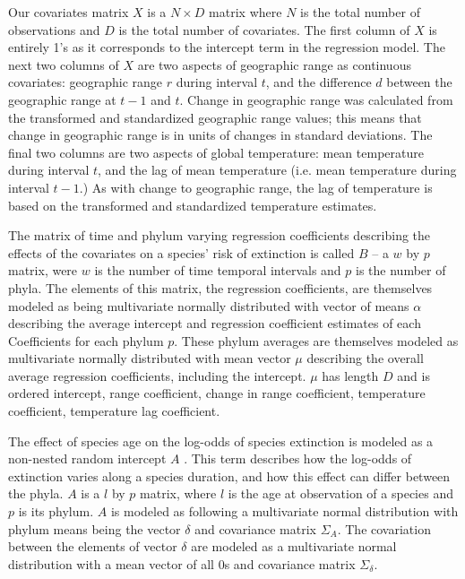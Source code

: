 \documentclass[12pt,letterpaper]{article}
\begin{document}
\begin{refsection}
Our covariates matrix \(X\) is a \(N \times D\) matrix where \(N\) is the total number of observations and \(D\) is the total number of covariates. The first column of \(X\) is entirely 1's as it corresponds to the intercept term in the regression model. The next two columns of \(X\) are two aspects of geographic range as continuous covariates: geographic range \(r\) during interval \(t\), and the difference \(d\) between the geographic range at \(t - 1\) and \(t\). Change in geographic range was calculated from the transformed and standardized geographic range values; this means that change in geographic range is in units of changes in standard deviations. The final two columns are two aspects of global temperature: mean temperature during interval \(t\), and the lag of mean temperature (i.e. mean temperature during interval \(t - 1\).) As with change to geographic range, the lag of temperature is based on the transformed and standardized temperature estimates. 

The matrix of time and phylum varying regression coefficients describing the effects of the covariates on a species' risk of extinction is called \(B\) -- a  \(w\) by \(p\) matrix, were \(w\) is the number of time temporal intervals and \(p\) is the number of phyla. The elements of this matrix, the regression coefficients, are themselves modeled as being multivariate normally distributed with vector of means \(\alpha\) describing the average intercept and regression coefficient estimates of each Coefficients for each phylum \(p\). These phylum averages are themselves modeled as multivariate normally distributed with mean vector \(\mu\) describing the overall average regression coefficients, including the intercept. \(\mu\) has length \(D\) and is ordered intercept, range coefficient, change in range coefficient, temperature coefficient, temperature lag coefficient.

The effect of species age on the log-odds of species extinction is modeled as a non-nested random intercept \(A\) \citep{Tutz2016}. This term describes how the log-odds of extinction varies along a species duration, and how this effect can differ between the phyla. \(A\) is a \(l\) by \(p\) matrix, where \(l\) is the age at observation of a species and \(p\) is its phylum. \(A\) is modeled as following a multivariate normal distribution with phylum means being the vector \(\delta\) and covariance matrix \(\Sigma_{A}\). The covariation between the elements of vector \(\delta\) are modeled as a multivariate normal distribution with a mean vector of all 0s and covariance matrix \(\Sigma_{\delta}\).


\end{refsection}
\end{document}
